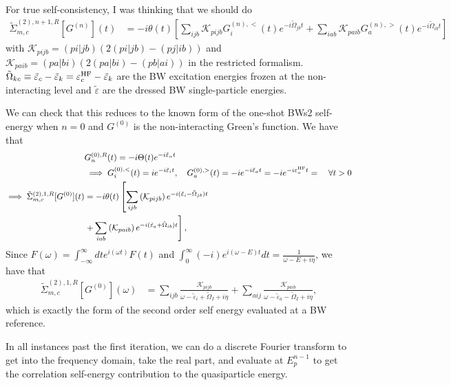 For true self-consistency, I was thinking that we should do 
\begin{align}
\tilde{\Sigma}_{m, c}^{(2),n+1,R}[G^{(n)}](t) &= -i\theta(t)\left[\sum_{ijb}\mathcal{K}_{pijb} G^{(n),<}_{i}(t) e^{-i\tilde{\Omega}_{jb} t} + \sum_{iab}\mathcal{K}_{paib} G^{(n),>}_{a}(t) e^{-i\tilde{\Omega}_{ib} t}\right]
\label{eq:correlation_self_energy_bw}
\end{align}
with $\mathcal{K}_{pijb} = (pi|jb)\left(2(pi|jb)-(pj|ib)\right)$ and $\mathcal{K}_{paib} = (pa|bi)\left(2(pa|bi)-(pb|ai)\right)$ in the restricted formalism. $\tilde{\Omega}_{kc} \equiv \tilde{\varepsilon}_c - \tilde{\varepsilon}_k={\varepsilon}^{\rm HF}_c - \tilde{\varepsilon}_k$ are the BW excitation energies frozen at the non-interacting level and $\tilde{\varepsilon}$ are the dressed BW single-particle energies. 
\begin{tcolorbox}[colback=red!5!white, colframe=red!75!black, title=How this reduces to the one-shot BWs2 self-energy ]
We can check that this reduces to the known form of the one-shot BWs2 self-energy when $n=0$ and $G^{(0)}$ is the non-interacting Green's function. We have that
\begin{align}
    &G^{(0),R}_{n}(t)=-i\Theta(t)e^{-i\tilde{\varepsilon}_nt}\\
&\implies G^{(0),<}_{i}(t)=ie^{-i\tilde{\varepsilon}_i t}, \quad G^{(0),>}_{a}(t)=-ie^{-i\tilde{\varepsilon}_a t}=-ie^{-i{\varepsilon}^{\rm HF}_a t}= \quad \forall t>0\\
\implies \tilde{\Sigma}_{m, c}^{(2),1,R}[G^{(0)}](t)&=-i\theta(t)\left[\sum_{ijb}\left(\mathcal{K}_{pijb}\right) e^{-i(\tilde{\varepsilon}_i-\tilde{\Omega}_{jb}) t}\right.\\
&\left. + \sum_{iab}\left( \mathcal{K}_{paib}\right) e^{-i(\tilde{\varepsilon}_a+\tilde{\Omega}_{ib}) t}\right],
\end{align}
Since $F(\omega) = \int_{-\infty}^{\infty} dt e^{i(\omega t)} F(t)$ and $\int_{0}^{\infty} (-i) e^{i(\omega -E) t} dt = \frac{1}{\omega - E + i\eta}$, we have that
\begin{align}
    \tilde{\Sigma}_{m, c}^{(2),1,R}[G^{(0)}](\omega) &= \sum_{ijb}\frac{\mathcal{K}_{pijb}}{\omega - \tilde{\varepsilon}_i+\tilde{\Omega}_I + i\eta} + \sum_{aij}\frac{\mathcal{K}_{paib}}{\omega - \tilde{\varepsilon}_a-\tilde{\Omega}_I + i\eta},
\end{align}
which is exactly the form of the second order self energy evaluated at a BW reference.
\end{tcolorbox}
In all instances past the first iteration, we can do a discrete Fourier transform to get into the frequency domain, take the real part, and evaluate at $E^{n-1}_p$ to get the correlation self-energy contribution to the quasiparticle energy.
